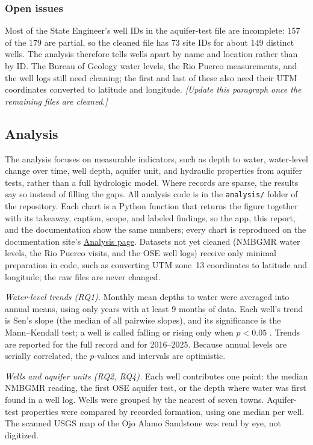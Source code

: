 \documentclass[10pt,twocolumn,letterpaper]{article}
\newif\ifdraftnotes \draftnotestrue   %
\newcommand{\draftnote}[1]{\ifdraftnotes{\color{draftorange}\itshape[#1]}\fi}
\begin{document}
\subsubsection{Open issues}
Most of the State Engineer's well IDs in the aquifer-test file are incomplete: 157 of the 179 are
partial, so the cleaned file has 73 site IDs for about 149 distinct wells. The analysis therefore
tells wells apart by name and location rather than by ID. The Bureau of Geology water levels, the
Rio Puerco measurements, and the well logs still need cleaning; the first and last of these also
need their UTM coordinates converted to latitude and longitude.
\draftnote{Update this paragraph once the remaining files are cleaned.}

\subsection{Analysis}
The analysis focuses on measurable indicators, such as depth to water, water-level change over
time, well depth, aquifer unit, and hydraulic properties from aquifer tests, rather than a full
hydrologic model. Where records
are sparse, the results say so instead of filling the gaps.
All analysis code is in the \texttt{analysis/} folder of the repository. Each chart is a Python
function that returns the figure together with its takeaway, caption, scope, and labeled findings,
so the app, this report, and the documentation show the same numbers; every chart is reproduced on
the documentation site's \href{https://pdjordj11.github.io/eng_220_aquifer_project/analysis/}{Analysis page}. Datasets not yet cleaned (NMBGMR water levels, the Rio
Puerco visits, and the OSE well logs) receive only minimal preparation in code, such as converting
UTM zone~13 coordinates to latitude and longitude; the raw files are never changed.

\emph{Water-level trends (RQ1).} Monthly mean depths to water were averaged into annual means,
using only years with at least 9 months of data. Each well's trend is Sen's slope (the median of all
pairwise slopes), and its significance is the Mann--Kendall test; a well is called falling or rising
only when $p<0.05$ \citep{helsel2020}. Trends are reported for the full record and for 2016--2025.
Because annual levels are serially correlated, the $p$-values and intervals are optimistic.

\emph{Wells and aquifer units (RQ2, RQ4).} Each well contributes one point: the median NMBGMR
reading, the first OSE aquifer test, or the depth where water was first found in a well log. Wells
were grouped by the nearest of seven towns. Aquifer-test properties were compared by recorded
formation, using one median per well. The scanned USGS map of the Ojo Alamo Sandstone
\citep{thorn1990} was read by eye, not digitized.
\end{document}
